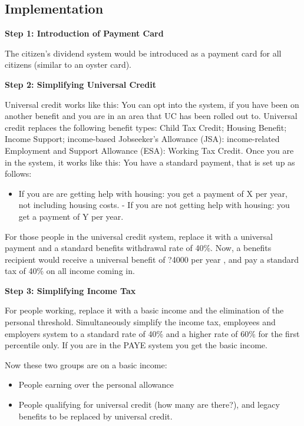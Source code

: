 \documentclass[]{tufte-handout}
\providecommand{\tightlist}{%
  \setlength{\itemsep}{0pt}\setlength{\parskip}{0pt}}
\begin{document}
\hypertarget{implementation}{%
\subsection{Implementation}\label{implementation}}

\textbf{Step 1: Introduction of Payment Card}

The citizen's dividend system would be introduced as a payment card for
all citizens (similar to an oyster card).

\textbf{Step 2: Simplifying Universal Credit}

Universal credit works like this: You can opt into the system, if you
have been on another benefit and you are in an area that UC has been
rolled out to. Universal credit replaces the following benefit types:
Child Tax Credit; Housing Benefit; Income Support; income-based
Jobseeker's Allowance (JSA): income-related Employment and Support
Allowance (ESA): Working Tax Credit. Once you are in the system, it
works like this: You have a standard payment, that is set up as follows:

\begin{itemize}
\tightlist
\item
  If you are are getting help with housing: you get a payment of X per
  year, not including housing costs. - If you are not getting help with
  housing: you get a payment of Y per year.
\end{itemize}

For those people in the universal credit system, replace it with a
universal payment and a standard benefits withdrawal rate of 40\%. Now,
a benefits recipient would receive a universal benefit of ?4000 per year
, and pay a standard tax of 40\% on all income coming in.

\textbf{Step 3: Simplifying Income Tax}

For people working, replace it with a basic income and the elimination
of the personal threshold. Simultaneously simplify the income tax,
employees and employers system to a standard rate of 40\% and a higher
rate of 60\% for the first percentile only. If you are in the PAYE
system you get the basic income.

Now these two groups are on a basic income:

\begin{itemize}
\tightlist
\item
  People earning over the personal allowance
\item
  People qualifying for universal credit (how many are there?), and
  legacy benefits to be replaced by universal credit.
\end{itemize}
\end{document}
